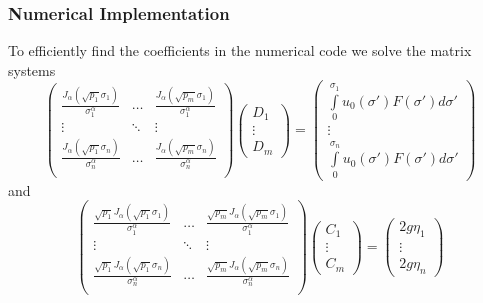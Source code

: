 	
		\begin{frame}
		\frametitle{Numerical Implementation}
		To efficiently find the coefficients in the numerical code we solve the matrix systems
		\[
		\begin{pmatrix}
		\frac{J_\alpha(\sqrt{p_1}\sigma_1)}{\sigma_1^\alpha}&\ldots &\frac{J_\alpha(\sqrt{p_m}\sigma_1)}{\sigma_1^\alpha}\\
		\vdots&\ddots&\vdots\\
		\frac{J_\alpha(\sqrt{p_1}\sigma_n)}{\sigma_n^\alpha}&\ldots&\frac{J_\alpha(\sqrt{p_m}\sigma_n)}{\sigma_n^\alpha}\\
		\end{pmatrix}\begin{pmatrix}D_1\\\vdots\\D_m\end{pmatrix}=\begin{pmatrix} \int\limits_0^{\sigma_1} u_0(\sigma ')F(\sigma ')d \sigma'\\\vdots \\\int\limits_0^{\sigma_n} u_0(\sigma ')F(\sigma ')d \sigma' \end{pmatrix}
		\]
		and
				\[
		\begin{pmatrix}
		\frac{\sqrt{p_1}J_\alpha(\sqrt{p_1}\sigma_1)}{\sigma_1^\alpha}&\ldots &\frac{\sqrt{p_m}J_\alpha(\sqrt{p_m}\sigma_1)}{\sigma_1^\alpha}\\
		\vdots&\ddots&\vdots\\
		\frac{\sqrt{p_1}J_\alpha(\sqrt{p_1}\sigma_n)}{\sigma_n^\alpha}&\ldots&\frac{\sqrt{p_m}J_\alpha(\sqrt{p_m}\sigma_n)}{\sigma_n^\alpha}\\
		\end{pmatrix}\begin{pmatrix}C_1\\\vdots\\C_m\end{pmatrix}=\begin{pmatrix} 2g\eta_1\\\vdots \\2g\eta_n\end{pmatrix}
		\]
	\end{frame}
	

	
	
	
	
	
	
	
	
	
	
	
	
	
	
	
	
	
	
	
	
	
	
	
	
